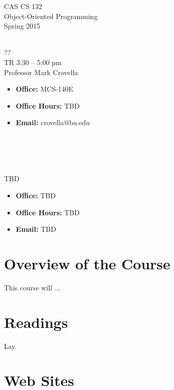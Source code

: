 \documentclass[11pt]{article}
\begin{document}
\begin{center}
\LARGE CAS CS 132\\
\Large Object-Oriented Programming\\
\Large\rm Spring 2015\\~\\
\end{center}

 ??\\[\baselineskip]
 TR 3:30 -- 5:00 pm 
\\[\baselineskip] 

 Professor Mark Crovella\\[0.75\baselineskip]
\begin{minipage}[t]{0.60\textwidth}
\begin{itemize}
\item {\bf Office:} MCS-140E
\item {\bf Office Hours:} {\small TBD}
\item {\bf Email:} crovella@bu.edu
\end{itemize}
\end{minipage}
~\\~\\~\\~\\
  TBD\\[0.75\baselineskip]
 \begin{minipage}[t]{0.60\textwidth}
 \begin{itemize}
 \item {\bf Office:} TBD
 \item {\bf Office Hours:} {\small TBD}
 \item {\bf Email:} TBD
 \end{itemize}
 \end{minipage}

\section*{Overview of the Course}

This course will ...

\section*{Readings} 

Lay.

\section*{Web Sites} 
\end{document}
